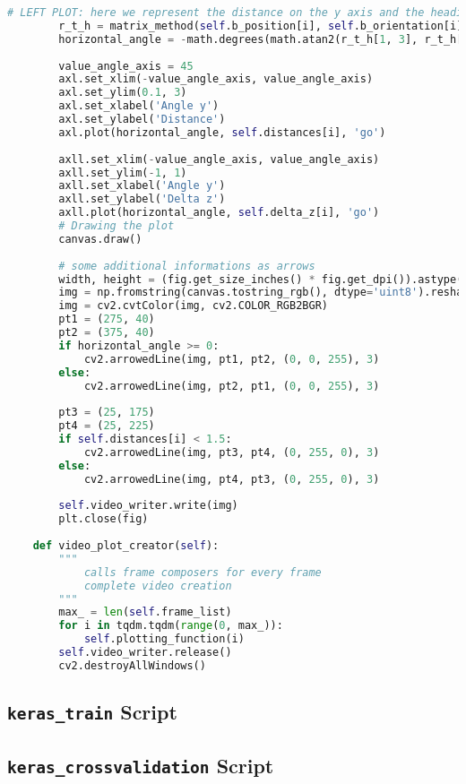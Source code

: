 \begin{lstlisting}[caption={Video creator class},label={lst:videocreator},language=Python]
		# LEFT PLOT: here we represent the distance on the y axis and the heading correction for the drone in degrees on the x-axis
		r_t_h = matrix_method(self.b_position[i], self.b_orientation[i], self.h_position[i], self.h_orientation[i])
		horizontal_angle = -math.degrees(math.atan2(r_t_h[1, 3], r_t_h[0, 3]))
		
		value_angle_axis = 45
		axl.set_xlim(-value_angle_axis, value_angle_axis)
		axl.set_ylim(0.1, 3)
		axl.set_xlabel('Angle y')
		axl.set_ylabel('Distance')
		axl.plot(horizontal_angle, self.distances[i], 'go')
		
		axll.set_xlim(-value_angle_axis, value_angle_axis)
		axll.set_ylim(-1, 1)
		axll.set_xlabel('Angle y')
		axll.set_ylabel('Delta z')
		axll.plot(horizontal_angle, self.delta_z[i], 'go')
		# Drawing the plot
		canvas.draw()
		
		# some additional informations as arrows
		width, height = (fig.get_size_inches() * fig.get_dpi()).astype(dtype='int32')
		img = np.fromstring(canvas.tostring_rgb(), dtype='uint8').reshape(height, width, 3)
		img = cv2.cvtColor(img, cv2.COLOR_RGB2BGR)
		pt1 = (275, 40)
		pt2 = (375, 40)
		if horizontal_angle >= 0:
			cv2.arrowedLine(img, pt1, pt2, (0, 0, 255), 3)
		else:
			cv2.arrowedLine(img, pt2, pt1, (0, 0, 255), 3)
		
		pt3 = (25, 175)
		pt4 = (25, 225)
		if self.distances[i] < 1.5:
			cv2.arrowedLine(img, pt3, pt4, (0, 255, 0), 3)
		else:
			cv2.arrowedLine(img, pt4, pt3, (0, 255, 0), 3)
		
		self.video_writer.write(img)
		plt.close(fig)
	
	def video_plot_creator(self):
		"""
			calls frame composers for every frame
			complete video creation
		"""
		max_ = len(self.frame_list)
		for i in tqdm.tqdm(range(0, max_)):
			self.plotting_function(i)
		self.video_writer.release()
		cv2.destroyAllWindows()
\end{lstlisting}
\subsection*{\texttt{keras\_train} Script}
%
\subsection*{\texttt{keras\_crossvalidation} Script}
%
